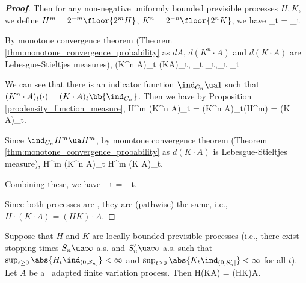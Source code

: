 \begin{proof}[\bf Proof]
Then for any non-negative uniformly bounded previsible processes $H,K$, we define $H^m = 2^{-m}\floor{2^m H}$, $K^n = 2^{-n}\floor{2^n K}$, we have
\be
{}_t = _t
\ee

By monotone convergence theorem (Theorem \ref{thm:monotone_convergence_probability} as $dA$, $d(K^n\cdot A)$ and $d(K\cdot A)$ are Lebesgue-Stieltjes measures),
\be
(K^n \cdot A)_t \ua (K\cdot A)_t, \quad {}_t \ua {}_t,\quad{}_t \ua {}_t
\ee

We can see that there is an indicator function $\ind_{C_n} \ua 1$ such that $(K^n \cdot A)_t(\cdot) = (K \cdot A)_t\bb{\ind_{C_n}}$. Then we have by Proposition \ref{pro:density_function_measure},
\be
H^m \cdot (K^n \cdot A)_t = (K^n \cdot A)_t(H^m) = (K \cdot A)_t.
\ee

Since $\ind_{C_n}H^m \ua H^m$, by monotone convergence theorem (Theorem \ref{thm:monotone_convergence_probability} as $d(K\cdot A)$ is Lebesgue-Stieltjes measure),
\be
H^m \cdot (K^n \cdot A)_t \ua H^m \cdot (K \cdot A)_t.
\ee



Combining these, we have
\be
{}_t =  _t.
\ee

Since both processes are \cadlag, they are (pathwise) the same, i.e., $H\cdot (K\cdot A) = (HK)\cdot A$.
\end{proof}

\begin{theorem}\label{thm:locally_bounded_previsible_finite_variation_integral}
Suppose that $H$ and $K$ are locally bounded previsible processes (i.e., there exist stopping times $S_n\ua \infty$ a.s. and $S_n'\ua \infty$ a.s. such that $\sup_{ t\geq 0} \abs{H_t\ind_{(0,S_n]}} < \infty$ and $\sup_{t\geq 0} \abs{K_t\ind_{(0,S_n']}} < \infty$ for all $t$). Let $A$ be a \cadlag\ adapted finite variation process. Then
\be
H\cdot (K\cdot A) = (HK)\cdot A.
\ee
\end{theorem}

